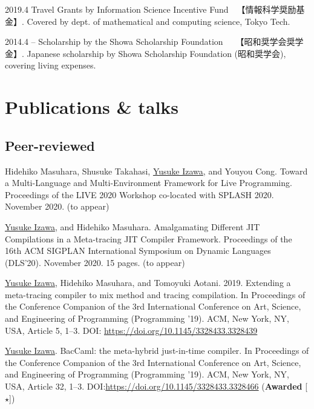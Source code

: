 \documentclass[11pt]{article} %
\newcommand{\YusukeIzawa}{\underline{Yusuke Izawa}}
\newcommand{\伊澤侑祐}{\underline{伊澤侑祐}}
\newcommand{\jit}{\textsc{JIT} }
\begin{document}
\grant
{2019.4}
{Travel Grants by Information Science Incentive Fund~~【情報科学奨励基金】.}
{Covered by dept. of mathematical and computing science, Tokyo Tech.}


\grant
{2014.4 -- }
{Scholarship by the Showa Scholarship Foundation~~~【昭和奨学会奨学金】.}
{Japanese scholarship by Showa Scholarship Foundation (昭和奨学会), covering
  living expenses.}


\section*{Publications \& talks}

\subsection*{Peer-reviewed}

 Hidehiko Masuhara, Shusuke Takahasi, \YusukeIzawa, and Youyou
Cong. Toward a Multi-Language and Multi-Environment Framework for Live Programming.
Proceedings of the LIVE 2020 Workshop co-located with SPLASH 2020. November 2020. (to
appear)
\medskip

 \YusukeIzawa, and Hidehiko Masuhara. Amalgamating Different \jit
Compilations in a Meta-tracing \jit Compiler Framework. Proceedings of the 16th ACM
SIGPLAN International Symposium on Dynamic Languages (DLS'20). November 2020. 15
pages. (to appear)
\medskip

 \YusukeIzawa, Hidehiko Masuhara, and Tomoyuki
Aotani. 2019. Extending a meta-tracing compiler to mix method and tracing
compilation. In Proceedings of the Conference Companion of the 3rd International
Conference on Art, Science, and Engineering of Programming (Programming
’19). ACM, New York, NY, USA, Article 5, 1–3. DOI:
\url{https://doi.org/10.1145/3328433.3328439}
\medskip

 \YusukeIzawa. BacCaml: the meta-hybrid just-in-time compiler. In
Proceedings of the Conference Companion of the 3rd International Conference on
Art, Science, and Engineering of Programming (Programming ’19). ACM, New York,
NY, USA, Article 32, 1–3. DOI:\url{https://doi.org/10.1145/3328433.3328466}
(\textbf{Awarded} [$\star$])
\medskip
\end{document}
